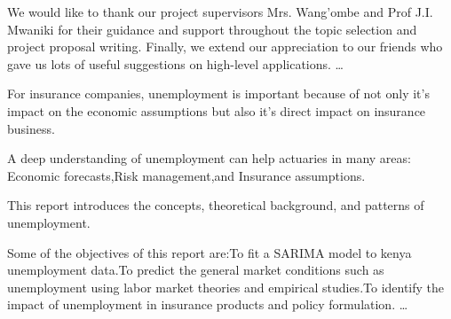 \documentclass[
openany,
12pt, %
english, %
singlespacing, %
liststotoc, %
toctotoc, %
parskip, %
headsepline, %
]{MastersDoctoralThesis} %
\begin{document}
\newpage
\begin{acknowledgements}
\addchaptertocentry{\acknowledgementname} %
We would like to thank our project supervisors Mrs. Wang'ombe and Prof J.I. Mwaniki for their guidance and support throughout the topic selection and project proposal writing.
Finally, we extend our appreciation to our friends who gave us lots of useful suggestions on high-level applications.
\ldots
\end{acknowledgements}

\newpage
For insurance companies, unemployment is important because of not only it's impact on the economic assumptions but also it's direct impact on insurance business.
\par
\noindent
A deep understanding of unemployment can help actuaries in many areas: Economic forecasts,Risk management,and Insurance assumptions.
\par
\noindent
This report introduces the concepts, theoretical background, and patterns of unemployment.
\par
\noindent
Some of the objectives of this report are:To fit a SARIMA model to kenya unemployment data.To predict the general market conditions such as unemployment using labor market theories and empirical studies.To identify the impact of unemployment in insurance products and policy formulation. \ldots







\tableofcontents %
\listoftables
\listoffigures

\mainmatter %

\pagestyle{thesis} %



 

 
 

\end{document}

